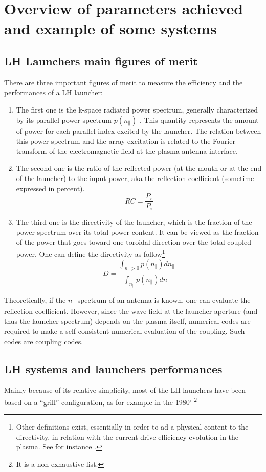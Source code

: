 \section{Overview of parameters achieved and example of some systems}
\subsection{LH Launchers main figures of merit}

There are three important figures of merit to measure the efficiency and the performances of a LH launcher: 
\begin{enumerate}
	\item The first one is the k-space radiated power spectrum, generally characterized by its parallel power spectrum $p(n_{\parallel})$ . This quantity represents the amount of power for each parallel index excited by the launcher. The relation between this power spectrum and the array excitation is related to the Fourier transform of the electromagnetic field at the plasma-antenna interface. 

	\item  The second one is the ratio of the reflected power (at the mouth or at the end of the launcher) to the input power, aka the reflection coefficient (sometime expressed in percent). 
$$RC = \frac{P_r}{P_i}$$
	\item The third one is the directivity of the launcher, which is the fraction of the power spectrum over its total power content. It can be viewed as the fraction of the power that goes toward one toroidal direction over the total coupled power. One can define the directivity as follow\footnote{Other definitions exist, essentially in order to ad a physical content to the directivity, in relation with the current drive efficiency evolution in the plasma. See for instance \parencite{Litaudon1990a}.}
$$
D
= 
\frac{
	\int_{n_{\parallel} >0} p(n_{\parallel}) dn_{\parallel} 
	}{
	\int_{n_{\parallel}} p(n_{\parallel}) dn_{\parallel} } 
$$
\end{enumerate}

Theoretically, if the $n_{\parallel}$ spectrum of an antenna is known, one can evaluate the reflection coefficient. However, since the wave field at the launcher aperture (and thus the launcher spectrum) depends on the plasma itself, numerical codes are required to make a self-consistent numerical evaluation of the coupling. Such codes are coupling codes.

\subsection{LH systems and launchers performances}
Mainly because of its relative simplicity, most of the LH launchers have been based on a “grill” configuration, as for example in the 1980' \parencite{Porkolab1984a, Gormezano1986a, Stevens1988}\footnote{It is a non exhaustive list.}


